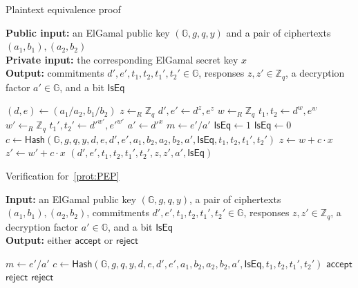 \documentclass[12pt,a4paper]{article}
\theoremstyle{definition}
\begin{document}
\begin{algorithm}\caption{Plaintext equivalence proof}\label{prot:PEP}
    \textbf{Public input:} an ElGamal public key $(\mathbb{G}, g, q, y)$ and a pair of ciphertexts $(a_1, b_1), (a_2, b_2)$\\
    \textbf{Private input:} the corresponding ElGamal secret key $x$\\
    \textbf{Output:} commitments $d', e', t_1, t_2, t_1', t_2'\in\mathbb{G}$, responses $z, z' \in \mathbb{Z}_q$, a decryption factor $a' \in \mathbb{G}$, and a bit $\mathsf{IsEq}$
    \begin{algorithmic}[1]
        \State $(d, e) \gets (a_1/a_2, b_1/b_2)$
        \State $z\leftarrow_R\mathbb{Z}_q$
        \State $d', e' \gets d^z, e^z$
        \State $w \gets_R \mathbb{Z}_q$
        \State $t_1, t_2 \gets d^w, e^w$
        \State $w' \gets_R \mathbb{Z}_q$
        \State $t_1', t_2' \gets d'^{w'}, e'^{w'}$
        \State $a' \gets d'^x$
        \State $m \gets e'/a'$
            \State $\mathsf{IsEq} \gets 1$
        \Else
            \State $\mathsf{IsEq} \gets 0$
        \EndIf
        \State $c \gets \mathsf{Hash}(\mathbb{G}, g, q, y, d, e, d', e', a_1, b_2, a_2, b_2, a', \mathsf{IsEq}, t_1, t_2, t_1', t_2')$
        \State $z \gets w + c\cdot x$
        \State $z' \gets w' + c\cdot x$
        \State \Return $(d', e', t_1, t_2, t_1', t_2', z, z', a', \mathsf{IsEq})$
    \end{algorithmic}
\end{algorithm}
\begin{algorithm}\caption{Verification for~\ref{prot:PEP}}\label{prot:VerifyPEP}
    \textbf{Input:} an ElGamal public key $(\mathbb{G}, g, q, y)$, a pair of ciphertexts $(a_1, b_1), (a_2, b_2)$, commitments $d', e', t_1, t_2, t_1', t_2'\in\mathbb{G}$, responses $z, z' \in \mathbb{Z}_q$, a decryption factor $a' \in \mathbb{G}$, and a bit $\mathsf{IsEq}$\\
    \textbf{Output:} either $\mathsf{accept}$ or $\mathsf{reject}$
    \begin{algorithmic}[1]
        \State $m \gets e'/a'$
        \State $c \gets \mathsf{Hash}(\mathbb{G}, g, q, y, d, e, d', e', a_1, b_2, a_2, b_2, a', \mathsf{IsEq}, t_1, t_2, t_1', t_2')$
                \State \Return $\mathsf{accept}$
            \Else
                \State \Return $\mathsf{reject}$
            \EndIf
        \Else
            \State \Return $\mathsf{reject}$
        \EndIf
    \end{algorithmic}
\end{algorithm}
\end{document}
